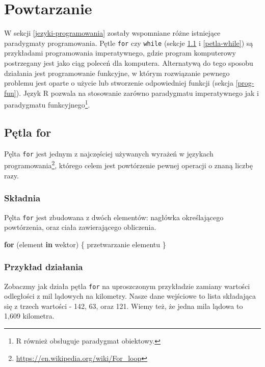 \documentclass[paper=6in:9in,pagesize=pdftex,headinclude=on,footinclude=on,10pt]{scrbook}
\newenvironment{Shaded}{\begin{snugshade}}{\end{snugshade}}
\newcommand{\ControlFlowTok}[1]{\textcolor[rgb]{0.13,0.29,0.53}{\textbf{#1}}}
\newcommand{\NormalTok}[1]{#1}
\begin{document}
\hypertarget{petle}{%
\chapter{Powtarzanie}\label{petle}}

W sekcji \ref{jezyki-programowania} zostały wspomniane różne istniejące paradygmaty programowania.
Pętle \texttt{for} czy \texttt{while} (sekcje \ref{petla-for} i \ref{petla-while}) są przykładami programowania imperatywnego, gdzie program komputerowy postrzegany jest jako ciąg poleceń dla komputera.
Alternatywą do tego sposobu działania jest programowanie funkcyjne, w którym rozwiązanie pewnego problemu jest oparte o użycie lub stworzenie odpowiedniej funkcji (sekcja \ref{prog-fun}).
Język R pozwala na stosowanie zarówno paradygmatu imperatywnego jak i paradygmatu funkcyjnego\footnote{R również obsługuje paradygmat obiektowy.}.

\hypertarget{petla-for}{%
\section{Pętla for}\label{petla-for}}

Pęlta \texttt{for} jest jednym z najczęściej używanych wyrażeń w językach programowania\footnote{\url{https://en.wikipedia.org/wiki/For_loop}}, którego celem jest powtórzenie pewnej operacji o znaną liczbę razy.

\hypertarget{skadnia}{%
\subsection{Składnia}\label{skadnia}}

Pęlta \texttt{for} jest zbudowana z dwóch elementów: nagłówka określającego powtórzenia, oraz ciała zawierającego obliczenia.

\begin{Shaded}
\begin{Highlighting}[]
\ControlFlowTok{for}\NormalTok{ (element }\ControlFlowTok{in}\NormalTok{ wektor) \{}
\NormalTok{  przetwarzanie elementu}
\NormalTok{\}}
\end{Highlighting}
\end{Shaded}

\hypertarget{for-example}{%
\subsection{Przykład działania}\label{for-example}}

Zobaczmy jak działa pętla \texttt{for} na uproszczonym przykładzie zamiany wartości odległości z mil lądowych na kilometry.
Nasze dane wejściowe to lista składająca się z trzech wartości - 142, 63, oraz 121.
Wiemy też, że jedna mila lądowa to 1,609 kilometra.
\end{document}
